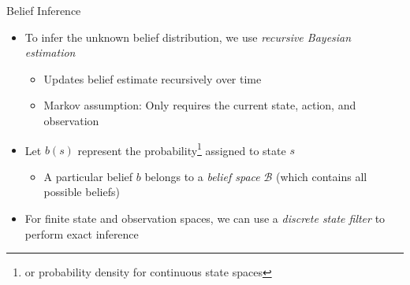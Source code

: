 \begin{frame}[fragile]{Belief Inference}

\begin{itemize}
    \item To infer the unknown belief distribution, we use \textit{recursive Bayesian estimation}
    \begin{itemize}
        \item Updates belief estimate recursively over time
        \item Markov assumption: Only requires the current state, action, and observation
    \end{itemize}
    \item Let $b(s)$ represent the probability\footnote{or probability density for continuous state spaces} assigned to state $s$
    \begin{itemize}
        \item A particular belief $b$ belongs to a \textit{belief space} $\mathcal{B}$ (which contains all possible beliefs)
    \end{itemize}
    \item For finite state and observation spaces, we can use a \textit{discrete state filter} to perform exact inference
\end{itemize}


\end{frame}